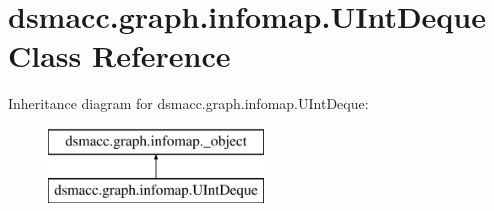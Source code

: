 \hypertarget{classdsmacc_1_1graph_1_1infomap_1_1UIntDeque}{}\section{dsmacc.\+graph.\+infomap.\+U\+Int\+Deque Class Reference}
\label{classdsmacc_1_1graph_1_1infomap_1_1UIntDeque}
Inheritance diagram for dsmacc.\+graph.\+infomap.\+U\+Int\+Deque\+:\begin{figure}[H]
\begin{center}
\leavevmode
\includegraphics[height=2.000000cm]{classdsmacc_1_1graph_1_1infomap_1_1UIntDeque}
\end{center}
\end{figure}
